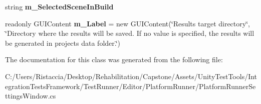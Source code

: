 \begin{DoxyCompactItemize}
\item 
\mbox{\label{class_unity_test_1_1_integration_tests_1_1_platform_runner_settings_window_acd26dc69ac97d0f65dea67173233407f}} 
string {\bfseries m\+\_\+\+Selected\+Scene\+In\+Build}
\item 
\mbox{\label{class_unity_test_1_1_integration_tests_1_1_platform_runner_settings_window_a6f360f20455c484f1b6f0b02a5445494}} 
readonly G\+U\+I\+Content {\bfseries m\+\_\+\+Label} = new G\+U\+I\+Content(\char`\"{}Results target directory\char`\"{}, \char`\"{}Directory where the results will be saved. If no value is specified, the results will be generated in project\textquotesingle{}s data folder.\char`\"{})
\end{DoxyCompactItemize}


The documentation for this class was generated from the following file\+:\begin{DoxyCompactItemize}
\item 
C\+:/\+Users/\+Ristaccia/\+Desktop/\+Rehabilitation/\+Capstone/\+Assets/\+Unity\+Test\+Tools/\+Integration\+Tests\+Framework/\+Test\+Runner/\+Editor/\+Platform\+Runner/Platform\+Runner\+Settings\+Window.\+cs\end{DoxyCompactItemize}
